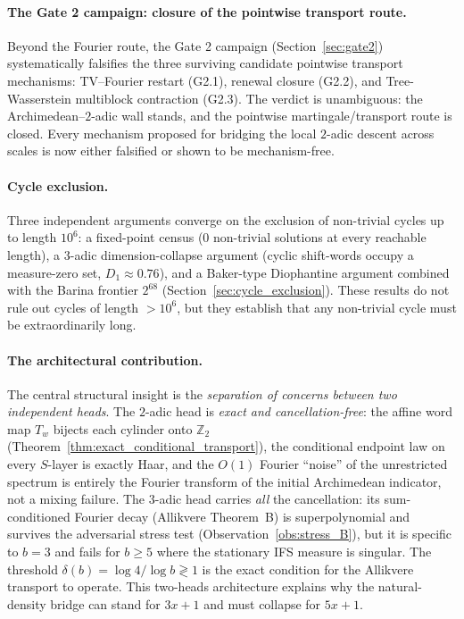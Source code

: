 \documentclass[12pt,a4paper]{article}
\theoremstyle{remark}
\begin{document}
\paragraph{The Gate 2 campaign: closure of the pointwise transport route.}
Beyond the Fourier route, the Gate 2 campaign (Section~\ref{sec:gate2})
systematically falsifies the three surviving candidate pointwise transport
mechanisms: TV--Fourier restart (G2.1), renewal closure (G2.2), and
Tree-Wasserstein multiblock contraction (G2.3).  The verdict is unambiguous:
the Archimedean--$2$-adic wall stands, and the pointwise martingale/transport
route is closed.  Every mechanism proposed for bridging the local $2$-adic
descent across scales is now either falsified or shown to be mechanism-free.
\paragraph{Cycle exclusion.}
Three independent arguments converge on the exclusion of non-trivial cycles up
to length $10^6$: a fixed-point census ($0$ non-trivial solutions at every
reachable length), a $3$-adic dimension-collapse argument (cyclic shift-words
occupy a measure-zero set, $D_1\approx0.76$), and a Baker-type Diophantine
argument combined with the Barina frontier $2^{68}$
(Section~\ref{sec:cycle_exclusion}).  These results do not rule out cycles of
length $>10^6$, but they establish that any non-trivial cycle must be
extraordinarily long.
\paragraph{The architectural contribution.}
The central structural insight is the \emph{separation of concerns between two
independent heads}.  The $2$-adic head is \emph{exact and cancellation-free}:
the affine word map $T_w$ bijects each cylinder onto $\mathbb{Z}_2$
(Theorem~\ref{thm:exact_conditional_transport}), the conditional endpoint law
on every $S$-layer is exactly Haar, and the $O(1)$ Fourier ``noise'' of the
unrestricted spectrum is entirely the Fourier transform of the initial
Archimedean indicator, not a mixing failure.  The $3$-adic head carries
\emph{all} the cancellation: its sum-conditioned Fourier decay
(Allikvere Theorem~B) is superpolynomial and survives the adversarial stress
test (Observation~\ref{obs:stress_B}), but it is specific to $b=3$ and fails
for $b\ge5$ where the stationary IFS measure is singular.  The threshold
$\delta(b)=\log4/\log b\gtrless1$ is the exact condition for the
Allikvere transport to operate.  This two-heads architecture explains why the
natural-density bridge can stand for $3x+1$ and must collapse for $5x+1$.
\end{document}
